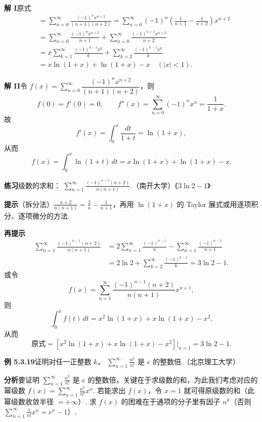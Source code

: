 \documentclass[UTF8,12pt,a4paper,fontset=fandol]{ctexart}
\begin{document}
\noindent\textbf{解 I}\quad 原式
\[
\begin{aligned}
&=\sum_{n=0}^{\infty}\frac{(-1)^nx^{n+2}}{(n+1)(n+2)}
=\sum_{n=0}^{\infty}(-1)^n\left(\frac1{n+1}-\frac1{n+2}\right)x^{n+2}\\
&=\sum_{n=0}^{\infty}\frac{(-1)^nx^{n+2}}{n+1}
+\sum_{n=0}^{\infty}\frac{(-1)^{n+1}x^{n+2}}{n+2}\\
&=x\sum_{k=1}^{\infty}\frac{(-1)^{k-1}x^k}{k}
+\sum_{k=2}^{\infty}\frac{(-1)^{k-1}x^k}{k}\\
&=x\ln(1+x)+\ln(1+x)-x\quad(|x|<1).
\end{aligned}
\]

\noindent\textbf{解 II}\quad 令
$f(x)=\displaystyle\sum_{n=0}^{\infty}\dfrac{(-1)^nx^{n+2}}{(n+1)(n+2)}$，则
\[
  f(0)=f'(0)=0,\qquad f''(x)=\sum_{n=0}^{\infty}(-1)^nx^n=\frac1{1+x}.
\]
故
\[
  f'(x)=\int_0^x\frac{dt}{1+t}=\ln(1+x),
\]
从而
\[
  f(x)=\int_0^x\ln(1+t)\,dt=x\ln(1+x)+\ln(1+x)-x.
\]

\noindent\textbf{练习}\quad 级数的求和：
$\displaystyle\sum_{n=1}^{\infty}\frac{(-1)^{n-1}(n+2)}{n(n+1)}$.（南开大学）\hfill《$3\ln2-1$》

\noindent\textbf{提示}\quad （拆分法）$\displaystyle\frac{n+2}{n(n+1)}=\frac2n-\frac1{n+1}$，再用
$\ln(1+x)$ 的 Taylor 展式或用逐项积分、逐项微分的方法.

\noindent\textbf{再提示}\quad
\[
\begin{aligned}
\sum_{n=1}^{\infty}\frac{(-1)^{n-1}(n+2)}{n(n+1)}
&=2\sum_{n=1}^{\infty}\frac{(-1)^{n-1}}n
-\sum_{n=1}^{\infty}\frac{(-1)^{n-1}}{n+1}\\
&=2\ln2+\sum_{k=2}^{\infty}\frac{(-1)^{k-1}}k
=3\ln2-1.
\end{aligned}
\]
或令
\[
  f(x)=\sum_{n=1}^{\infty}\frac{(-1)^{n-1}(n+2)}{n(n+1)}x^{n+1},
\]
则
\[
  \int_0^x f(t)\,dt=x^2\ln(1+x)+x\ln(1+x)-x^2.
\]
从而
\[
  \text{原式}=\left[x^2\ln(1+x)+x\ln(1+x)-x^2\right]\bigg|_{x=1}=3\ln2-1.
\]

\noindent\textbf{例 5.3.19}\quad 证明对任一正整数 $k$，
$\displaystyle\sum_{n=1}^{\infty}\frac{n^k}{n!}$ 是 $e$ 的整数倍.（北京理工大学）

\noindent\textbf{分析}\quad 要证明 $\displaystyle\sum_{n=1}^{\infty}\frac{n^k}{n!}$ 是 $e$ 的整数倍，关键在于求级数的和，为此我们考虑对应的幂级数
$f(x)=\displaystyle\sum_{n=1}^{\infty}\frac{n^k}{n!}x^n$. 若能求出 $f(x)$，令 $x=1$ 就可得原级数的和（此幂级数收敛半径 $=+\infty$）. 求 $f(x)$ 的困难在于通项的分子里有因子 $n^k$（否则
$\displaystyle\sum_{n=1}^{\infty}\frac1{n!}x^n=e^x-1$）.
\end{document}
